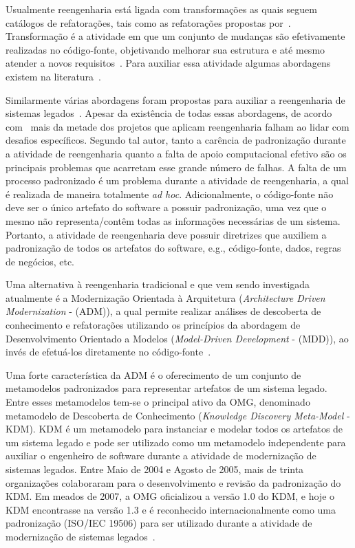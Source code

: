 Usualmente reengenharia está ligada com transformações as quais seguem catálogos de refatorações, tais como as refatorações propostas por~\citet{refactImpro}. Transformação é a atividade em que um conjunto de mudanças são efetivamente realizadas no código-fonte, objetivando melhorar sua estrutura e até mesmo atender a novos requisitos~\cite{Griswold}. Para auxiliar essa atividade algumas abordagens existem na literatura~\cite{bisbal, tilley, refactImpro}.

Similarmente várias abordagens foram propostas para auxiliar a reengenharia de sistemas legados~\cite{Griffith2011, Olszak:2012:RJP:2108329.2108539}.
Apesar da existência de todas essas abordagens, de acordo com~\citet{Sneed:2005} mais da metade dos projetos que aplicam reengenharia falham ao lidar com desafios específicos. Segundo tal autor, tanto a carência de  padronização durante a atividade de reengenharia quanto a falta de apoio computacional efetivo são os principais problemas que acarretam esse grande número de falhas.  A falta de um processo padronizado é um problema durante a atividade de reengenharia, a qual é realizada de maneira totalmente \textit{ad hoc}. Adicionalmente, o código-fonte não deve ser o único artefato do software a possuir padronização, uma vez que o mesmo não representa/contêm todas as informações necessárias de um sistema. Portanto, a atividade de reengenharia deve possuir diretrizes que auxiliem a padronização de todos os artefatos do software, e.g., código-fonte, dados, regras de negócios, etc.


Uma alternativa à reengenharia tradicional e que vem sendo investigada atualmente é a Modernização Orientada à Arquitetura (\textit{Architecture Driven Modernization} - (ADM)), a qual permite realizar análises de descoberta de conhecimento e refatorações utilizando os princípios da abordagem de Desenvolvimento Orientado a Modelos (\textit{Model-Driven Development} - (MDD)), ao invés de efetuá-los diretamente no código-fonte~\cite{PerezCastillo:2011jo}. 

Uma forte característica da ADM é o oferecimento de um conjunto de metamodelos padronizados para representar artefatos de um sistema legado. Entre esses metamodelos tem-se o principal ativo da OMG, denominado metamodelo de Descoberta de Conhecimento (\textit{Knowledge Discovery Meta-Model} - KDM). KDM é um metamodelo para instanciar e modelar todos os artefatos de um sistema legado e pode ser utilizado como um metamodelo independente para auxiliar o engenheiro de software durante a atividade de modernização de sistemas legados. Entre Maio de 2004 e Agosto de 2005, mais de trinta organizações colaboraram para o desenvolvimento e revisão da padronização do KDM. Em meados de 2007, a OMG oficializou a versão 1.0 do KDM, e hoje o KDM encontrasse na versão 1.3 e é reconhecido internacionalmente como uma padronização (ISO/IEC 19506) para ser utilizado durante a atividade de modernização de sistemas legados~\cite{ISOKDM}. 


